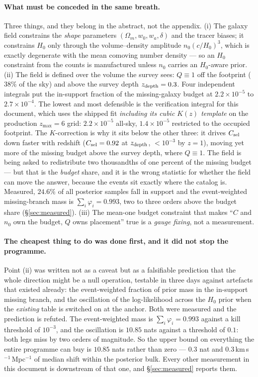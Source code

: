 \documentclass[11pt]{article}
\theoremstyle{definition}
\theoremstyle{remark}
\newcommand{\zmaxsix}{z_{\max}\!=\!6}
\newcommand{\Csel}{C_{\rm sel}}
\newcommand{\zdep}{z_{\rm depth}}
\begin{document}
\paragraph{What must be conceded in the same breath.} Three things, and they
belong in the abstract, not the appendix. (i) The galaxy field constrains the
\emph{shape} parameters $(\Omega_m,w_0,w_a,\delta)$ and the tracer biases; it
constrains $H_0$ only through the volume--density amplitude $n_0(c/H_0)^3$, which
is exactly degenerate with the mean comoving number density --- so an $H_0$
constraint from the counts is manufactured unless $n_0$ carries an $H_0$-aware
prior. (ii) The field is defined over the volume the survey sees: $Q\equiv1$ off
the footprint ($38\%$ of the sky) and above the survey depth $\zdep=0.3$. Four
independent integrals put the in-support fraction of the missing-galaxy budget at
$2.2\times10^{-5}$ to $2.7\times10^{-4}$. The lowest and most defensible is the
verification integral for this document, which uses the shipped fit
\emph{including its cubic $K(z)$ template} on the production $\zmaxsix$ grid:
$2.2\times10^{-5}$ all-sky, $1.4\times10^{-5}$ restricted to the occupied
footprint. The $K$-correction is why it sits below the other three: it drives
$\Csel$ down faster with redshift ($\Csel=0.92$ at $\zdep$, $<10^{-3}$ by
$z=1$), moving yet more of the missing budget above the survey depth, where
$Q\equiv1$. The field is being asked to redistribute two thousandths of one
percent of the missing budget --- but that is the \emph{budget} share, and it is
the wrong statistic for whether the field can move the answer, because the
events sit exactly where the catalog is. Measured, $24.6\%$ of all posterior
samples fall in support and the event-weighted missing-branch mass is
$\sum_i\varphi_i=0.993$, two to three orders above the budget share
(\S\ref{sec:measured}). (iii) The mean-one budget
constraint that makes ``$C$ and $n_0$ own the budget, $Q$ owns placement'' true is
a \emph{gauge fixing}, not a measurement.

\paragraph{The cheapest thing to do was done first, and it did not stop the
programme.} Point (ii) was written not as a caveat but as a falsifiable
prediction that the whole direction might be a null operation, testable in three
days against artefacts that existed already: the event-weighted fraction of prior
mass in the in-support missing branch, and the oscillation of the log-likelihood
across the $H_0$ prior when the \emph{existing} table is switched on at the
anchor. Both were measured and the prediction is refuted. The event-weighted mass
is $\sum_i\varphi_i=0.993$ against a kill threshold of $10^{-3}$, and the
oscillation is $10.85$ nats against a threshold of $0.1$: both legs miss by two
orders of magnitude. So the upper bound on everything the entire programme can
buy is $10.85$ nats rather than zero --- $0.3$ nat and
$0.3$\,km\,s$^{-1}$\,Mpc$^{-1}$ of median shift within the posterior bulk. Every
other measurement in this document is downstream of that one, and
\S\ref{sec:measured} reports them.
\end{document}
